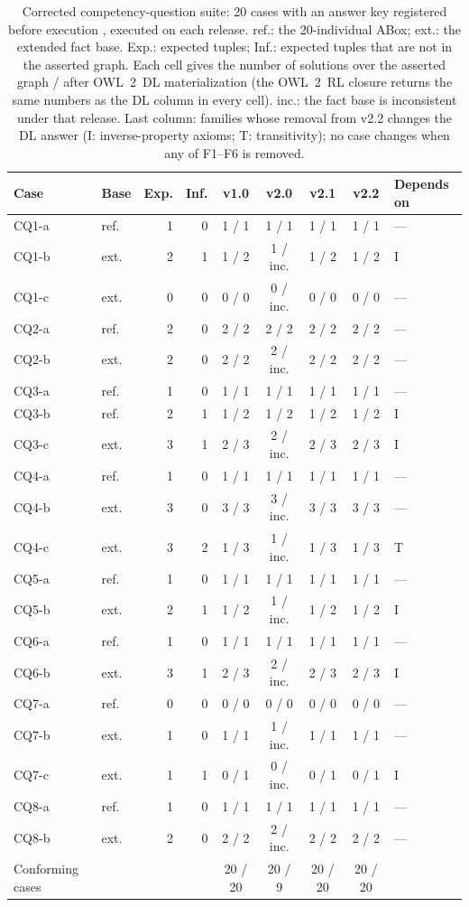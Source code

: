 \begin{table}[!t]
\caption{Corrected competency-question suite: 20 cases with an answer key registered before execution \cite{nogueira_thesis}, executed on each release. ref.: the 20-individual ABox; ext.: the extended fact base. Exp.: expected tuples; Inf.: expected tuples that are not in the asserted graph. Each cell gives the number of solutions over the asserted graph / after OWL~2~DL materialization (the OWL~2~RL closure returns the same numbers as the DL column in every cell). inc.: the fact base is inconsistent under that release. Last column: families whose removal from v2.2 changes the DL answer (I: inverse-property axioms; T: transitivity); no case changes when any of F1--F6 is removed.}
\label{tab:cqsuite}
\centering
\footnotesize
\begin{tabular}{llrrccccl}
\hline
\textbf{Case} & \textbf{Base} & \textbf{Exp.} & \textbf{Inf.} & \textbf{v1.0} & \textbf{v2.0} & \textbf{v2.1} & \textbf{v2.2} & \textbf{Depends on} \\
\hline
CQ1-a & ref. & 1 & 0 & 1 / 1 & 1 / 1 & 1 / 1 & 1 / 1 & --- \\
CQ1-b & ext. & 2 & 1 & 1 / 2 & 1 / inc. & 1 / 2 & 1 / 2 & I \\
CQ1-c & ext. & 0 & 0 & 0 / 0 & 0 / inc. & 0 / 0 & 0 / 0 & --- \\
CQ2-a & ref. & 2 & 0 & 2 / 2 & 2 / 2 & 2 / 2 & 2 / 2 & --- \\
CQ2-b & ext. & 2 & 0 & 2 / 2 & 2 / inc. & 2 / 2 & 2 / 2 & --- \\
CQ3-a & ref. & 1 & 0 & 1 / 1 & 1 / 1 & 1 / 1 & 1 / 1 & --- \\
CQ3-b & ref. & 2 & 1 & 1 / 2 & 1 / 2 & 1 / 2 & 1 / 2 & I \\
CQ3-c & ext. & 3 & 1 & 2 / 3 & 2 / inc. & 2 / 3 & 2 / 3 & I \\
CQ4-a & ref. & 1 & 0 & 1 / 1 & 1 / 1 & 1 / 1 & 1 / 1 & --- \\
CQ4-b & ext. & 3 & 0 & 3 / 3 & 3 / inc. & 3 / 3 & 3 / 3 & --- \\
CQ4-c & ext. & 3 & 2 & 1 / 3 & 1 / inc. & 1 / 3 & 1 / 3 & T \\
CQ5-a & ref. & 1 & 0 & 1 / 1 & 1 / 1 & 1 / 1 & 1 / 1 & --- \\
CQ5-b & ext. & 2 & 1 & 1 / 2 & 1 / inc. & 1 / 2 & 1 / 2 & I \\
CQ6-a & ref. & 1 & 0 & 1 / 1 & 1 / 1 & 1 / 1 & 1 / 1 & --- \\
CQ6-b & ext. & 3 & 1 & 2 / 3 & 2 / inc. & 2 / 3 & 2 / 3 & I \\
CQ7-a & ref. & 0 & 0 & 0 / 0 & 0 / 0 & 0 / 0 & 0 / 0 & --- \\
CQ7-b & ext. & 1 & 0 & 1 / 1 & 1 / inc. & 1 / 1 & 1 / 1 & --- \\
CQ7-c & ext. & 1 & 1 & 0 / 1 & 0 / inc. & 0 / 1 & 0 / 1 & I \\
CQ8-a & ref. & 1 & 0 & 1 / 1 & 1 / 1 & 1 / 1 & 1 / 1 & --- \\
CQ8-b & ext. & 2 & 0 & 2 / 2 & 2 / inc. & 2 / 2 & 2 / 2 & --- \\
\hline
Conforming cases & & & & 20 / 20 & 20 / 9 & 20 / 20 & 20 / 20 & \\
\hline
\end{tabular}
\end{table}

